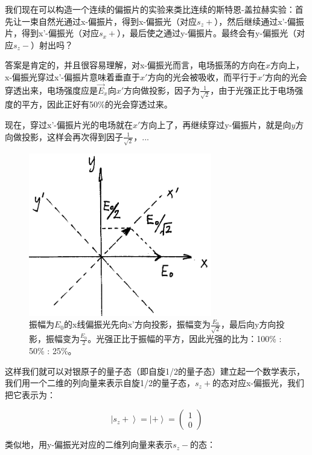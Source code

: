 我们现在可以构造一个连续的偏振片的实验来类比连续的斯特恩-盖拉赫实验：首先让一束自然光通过x-偏振片，得到x-偏振光（对应$s_z +$），然后继续通过x'-偏振片，得到x'-偏振光（对应$s_x +$），最后使之通过y-偏振片。最终会有y-偏振光（对应$s_z -$）射出吗？

答案是肯定的，并且很容易理解，对x-偏振光而言，电场振荡的方向在$x$方向上，x-偏振光穿过x'-偏振片意味着垂直于$x'$方向的光会被吸收，而平行于$x'$方向的光会穿透出来，电场强度应是$\vec E_x$向$x'$方向做投影，因子为$\frac{1}{\sqrt 2}$，由于光强正比于电场强度的平方，因此正好有50\%的光会穿透过来。

现在，穿过x'-偏振片光的电场就在$x'$方向上了，再继续穿过y-偏振片，就是向$y$方向做投影，这样会再次得到因子$\frac{1}{\sqrt 2}$，...

\begin{figure}[htbp]
\begin{center}
\includegraphics[width=8cm]{Spin/E0_projection.png}
\caption{振幅为$E_0$的x线偏振光先向x'方向投影，振幅变为$\frac{E_0}{\sqrt{2}}$，最后向y方向投影，振幅变为$\frac{E_0 }{2}$。光强正比于振幅的平方，因此光强的比为：100\% : 50\% : 25\%。}
\end{center}
\end{figure}

这样我们就可以对银原子的量子态（即自旋1/2的量子态）建立起一个数学表示，我们用一个二维的列向量来表示自旋1/2的量子态，$s_z +$的态对应x-偏振光，我们把它表示为：

\begin{equation}
\left| s_z + \right\rangle = \left| + \right\rangle = \left( \begin{array}{cc} 1 \\ 0 \end{array} \right)
\end{equation}

类似地，用y-偏振光对应的二维列向量来表示$s_z -$的态：

